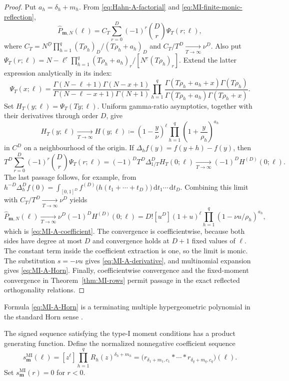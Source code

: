 \documentclass[10pt]{amsart}
\newcommand{\dd}{\,\mathrm d}
\newcommand{\mm}{\boldsymbol m}
\newcommand{\fall}[2]{#1^{\underline{#2}}}
\theoremstyle{plain}
\theoremstyle{definition}
\theoremstyle{remark}
\begin{document}
\begin{proof}
Put \(a_h=\delta_h+m_h\). From \eqref{eq:Hahn-A-factorial} and
\eqref{eq:MI-finite-monic-reflection},
\begin{equation}
 \widehat P_{\mm,N}(\ell)
 =C_T\sum_{r=0}^D(-1)^r\binom Dr\Psi_T(r;\ell),
 \label{eq:MI-finite-difference-form}
\end{equation}
where \(C_T=\fall{N}{D}\prod_{h=1}^q
(T\rho_h)_D/(T\rho_h+a_h)_D\) and
\(C_T/T^D\xrightarrow[T\to\infty]{}\nu^D\). Also put
\(\Psi_T(r;\ell)=\fall{N-\ell}{r}\prod_{h=1}^q
(T\rho_h+a_h)_r/[\fall{N}{r}(T\rho_h)_r]\).
Extend the latter expression analytically in its index:
\[
 \Psi_T(x;\ell)=
 \frac{\Gamma(N-\ell+1)\Gamma(N-x+1)}
 {\Gamma(N-\ell-x+1)\Gamma(N+1)}
 \prod_{h=1}^q
 \frac{\Gamma(T\rho_h+a_h+x)\Gamma(T\rho_h)}
 {\Gamma(T\rho_h+a_h)\Gamma(T\rho_h+x)}.
\]
Set \(H_T(y;\ell)=\Psi_T(Ty;\ell)\). Uniform gamma-ratio
asymptotics, together with their derivatives through order \(D\), give
\[
 H_T(y;\ell)\xrightarrow[T\to\infty]{}
 H(y;\ell)\coloneq\left(1-\frac y\nu\right)^\ell
 \prod_{h=1}^q\left(1+\frac y{\rho_h}\right)^{a_h}
\]
in \(C^D\) on a neighbourhood of the origin. If
\(\Delta_hf(y)=f(y+h)-f(y)\), then
\[
 T^D\sum_{r=0}^D(-1)^r\binom Dr\Psi_T(r;\ell)
 =(-1)^DT^D\Delta_{1/T}^DH_T(0;\ell)
 \xrightarrow[T\to\infty]{}(-1)^D H^{(D)}(0;\ell).
\]
The last passage follows, for example, from
\(h^{-D}\Delta_h^Df(0)=
\int_{[0,1]^D}f^{(D)}\bigl(h(t_1+\cdots+t_D)\bigr)
\dd t_1\cdots\dd t_D\).
Combining this limit with
\(C_T/T^D\xrightarrow[T\to\infty]{}\nu^D\) yields
\[
 \widehat P_{\mm,N}(\ell)\xrightarrow[T\to\infty]{}
 \nu^D(-1)^DH^{(D)}(0;\ell)
 =D![u^D](1+u)^\ell
   \prod_{h=1}^q(1-\nu u/\rho_h)^{a_h},
\]
which is \eqref{eq:MI-A-coefficient}. The convergence is coefficientwise,
because both sides have degree at most \(D\) and convergence holds at
\(D+1\) fixed values of \(\ell\). The constant term inside the
coefficient extraction is one, so the limit is monic. The substitution
\(s=-\nu u\) gives \eqref{eq:MI-A-derivative}, and multinomial expansion
gives \eqref{eq:MI-A-Horn}. Finally, coefficientwise convergence and the
fixed-moment convergence in Theorem~\ref{thm:MI-rows} permit passage in
the exact reflected orthogonality relations.
\end{proof}

Formula \eqref{eq:MI-A-Horn} is a terminating multiple hypergeometric
polynomial in the standard Horn sense \cite{SrivastavaKarlsson1985}.

The signed sequence satisfying the type-I moment conditions has a product
generating function.
Define the normalized nonnegative coefficient sequence
\begin{equation}
 s_{\mm}^{\mathrm{MI}}(\ell)
 =[z^\ell]\prod_{h=1}^qR_h(z)^{\delta_h+m_h}
 =\bigl(r_{\delta_1+m_1,c_1}*\cdots
 *r_{\delta_q+m_q,c_q}\bigr)(\ell).
 \label{eq:MI-B-seed}
\end{equation}
Set \(s_{\mm}^{\mathrm{MI}}(r)=0\) for \(r<0\).
\end{document}
